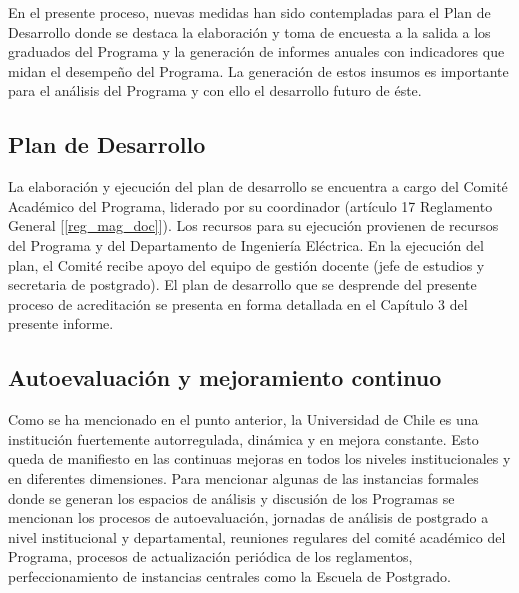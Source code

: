 En el presente proceso, nuevas medidas han sido contempladas para el Plan de Desarrollo
donde se destaca la elaboración y toma de encuesta a la salida a los graduados del Programa y
la generación de informes anuales con indicadores que midan el desempeño del Programa. La
generación de estos insumos es importante para el análisis del Programa y con ello el desarrollo
futuro de éste.

\subsection{Plan de Desarrollo}

La elaboración y ejecución del plan de desarrollo se encuentra a cargo del Comité Académico
del Programa, liderado por su coordinador (artículo 17 Reglamento General [\ref{reg_mag_doc}]). Los recursos
para su ejecución provienen de recursos del Programa y del Departamento de Ingeniería Eléctrica.
En la ejecución del plan, el Comité recibe apoyo del equipo de gestión docente (jefe de estudios
y secretaria de postgrado). El plan de desarrollo que se desprende del presente proceso de
acreditación se presenta en forma detallada en el Capítulo 3 del presente informe.

\subsection{Autoevaluación y mejoramiento continuo}

Como se ha mencionado en el punto anterior, la Universidad de Chile es una institución fuertemente
autorregulada, dinámica y en mejora constante. Esto queda de manifiesto en las continuas mejoras
en todos los niveles institucionales y en diferentes dimensiones. Para mencionar algunas de las
instancias formales donde se generan los espacios de análisis y discusión de los Programas se
mencionan los procesos de autoevaluación, jornadas de análisis de postgrado a nivel institucional y
departamental, reuniones regulares del comité académico del Programa, procesos de actualización
periódica de los reglamentos, perfeccionamiento de instancias centrales como la Escuela de
Postgrado.
